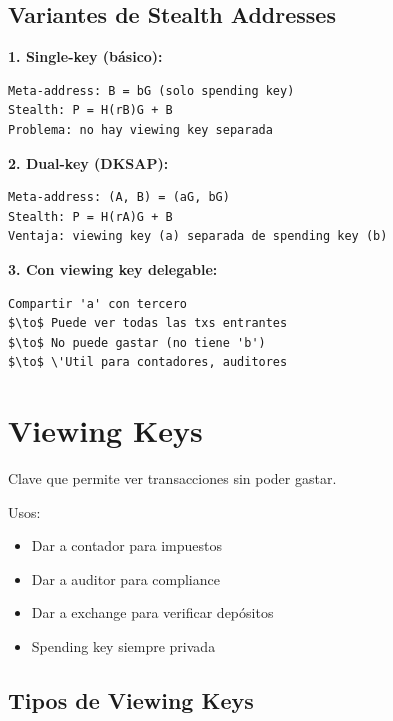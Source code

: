 \documentclass[11pt,a4paper,twoside]{book}
\begin{document}
\subsection{Variantes de Stealth Addresses}

\begin{example}
\textbf{1. Single-key (b\'asico):}
\begin{verbatim}
Meta-address: B = bG (solo spending key)
Stealth: P = H(rB)G + B
Problema: no hay viewing key separada
\end{verbatim}

\textbf{2. Dual-key (DKSAP):}
\begin{verbatim}
Meta-address: (A, B) = (aG, bG)
Stealth: P = H(rA)G + B
Ventaja: viewing key (a) separada de spending key (b)
\end{verbatim}

\textbf{3. Con viewing key delegable:}
\begin{verbatim}
Compartir 'a' con tercero
$\to$ Puede ver todas las txs entrantes
$\to$ No puede gastar (no tiene 'b')
$\to$ \'Util para contadores, auditores
\end{verbatim}
\end{example}

\section{Viewing Keys}
\label{sec:viewing-keys}

\begin{definition}
Clave que permite ver transacciones sin poder gastar.
\end{definition}

Usos:
\begin{itemize}
    \item Dar a contador para impuestos
    \item Dar a auditor para compliance
    \item Dar a exchange para verificar dep\'ositos
    \item Spending key siempre privada
\end{itemize}

\subsection{Tipos de Viewing Keys}
\end{document}
